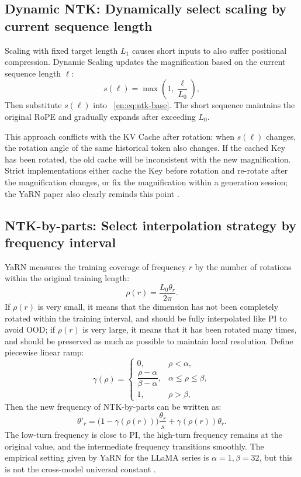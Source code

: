 \documentclass[UTF8,fontset=none,a4paper,10pt]{ctexart}
\begin{document}
\subsection{Dynamic NTK: Dynamically select scaling by current sequence length}

Scaling with fixed target length $L_1$ causes short inputs to also suffer positional compression. Dynamic Scaling updates the magnification \cite{en:peng2024yarn} based on the current sequence length $\ell$:
\begin{equation}
  s(\ell)=\max\left(1,\frac{\ell}{L_0}\right),
  \label{en:eq:dynamic-scale}
\end{equation}
Then substitute $s(\ell)$ into ~\eqref{en:eq:ntk-base}. The short sequence maintains the original RoPE and gradually expands after exceeding $L_0$.

This approach conflicts with the KV Cache after rotation: when $s(\ell)$ changes, the rotation angle of the same historical token also changes. If the cached Key has been rotated, the old cache will be inconsistent with the new magnification. Strict implementations either cache the Key before rotation and re-rotate after the magnification changes, or fix the magnification within a generation session; the YaRN paper also clearly reminds this point \cite{en:peng2024yarn}.

\subsection{NTK-by-parts: Select interpolation strategy by frequency interval}

YaRN measures the training coverage of frequency $r$ by the number of rotations within the original training length:
\begin{equation}
  \rho(r)=\frac{L_0\theta_r}{2\pi}.
  \label{en:eq:rotation-count}
\end{equation}
If $\rho(r)$ is very small, it means that the dimension has not been completely rotated within the training interval, and should be fully interpolated like PI to avoid OOD; if $\rho(r)$ is very large, it means that it has been rotated many times, and should be preserved as much as possible to maintain local resolution. Define piecewise linear ramp:
\begin{equation}
  \gamma(\rho)=
  \begin{cases}
    0,&\rho<\alpha,\\
    \dfrac{\rho-\alpha}{\beta-\alpha},&\alpha\le\rho\le\beta,\\
    1,&\rho>\beta,
  \end{cases}
  \label{en:eq:ramp}
\end{equation}
Then the new frequency of NTK-by-parts can be written as:
\begin{equation}
  \theta'_r=
  \bigl(1-\gamma(\rho(r))\bigr)\frac{\theta_r}{s}
  +\gamma(\rho(r))\theta_r.
  \label{en:eq:ntk-by-parts}
\end{equation}
The low-turn frequency is close to PI, the high-turn frequency remains at the original value, and the intermediate frequency transitions smoothly. The empirical setting given by YaRN for the LLaMA series is $\alpha=1,\beta=32$, but this is not the cross-model universal constant \cite{en:peng2024yarn}.
\end{document}
